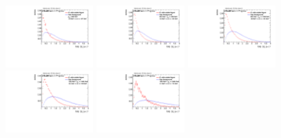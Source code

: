 \begin{figure}[H]
\bigskip
\includegraphics[width=0.3\textwidth]{sascha_input/Appendix/Distributions/higgs/distributions/beta17/h_assisted_tj_D2_17_bin1.pdf} \hspace{1mm}
\includegraphics[width=0.3\textwidth]{sascha_input/Appendix/Distributions/higgs/distributions/beta17/h_assisted_tj_D2_17_bin2.pdf} \hspace{4mm}
\includegraphics[width=0.3\textwidth]{sascha_input/Appendix/Distributions/higgs/distributions/beta17/h_assisted_tj_D2_17_bin3.pdf} 
\bigskip
\includegraphics[width=0.3\textwidth]{sascha_input/Appendix/Distributions/higgs/distributions/beta17/h_assisted_tj_D2_17_bin4.pdf} \hspace{4mm}
\includegraphics[width=0.3\textwidth]{sascha_input/Appendix/Distributions/higgs/distributions/beta17/h_assisted_tj_D2_17_bin5.pdf} 


\end{figure}
